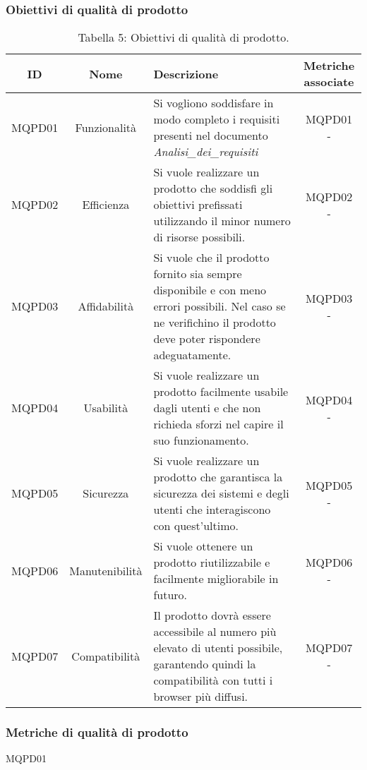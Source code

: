 \subsubsection{Obiettivi di qualità di prodotto}
\begin{table}[H]
	\centering
	\begin{tabularx}{\textwidth}{|c|c|X|c|}
		\hline
		\textbf{ID} & \textbf{Nome} & \textbf{Descrizione} & \textbf{Metriche associate}\\
		\hline
		MQPD01 & Funzionalità & Si vogliono soddisfare in modo completo i requisiti presenti nel documento \textit{Analisi\_dei\_requisiti} & MQPD01 - \\
		\hline
		MQPD02 & Efficienza & Si vuole realizzare un prodotto che soddisfi gli obiettivi prefissati utilizzando il minor numero di risorse possibili. & MQPD02 - \\
		\hline
		MQPD03 & Affidabilità & Si vuole che il prodotto fornito sia sempre disponibile e con meno errori possibili. Nel caso se ne verifichino il prodotto deve poter rispondere adeguatamente. & MQPD03 -\\
		\hline
		MQPD04 & Usabilità & Si vuole realizzare un prodotto facilmente usabile dagli utenti e che non richieda sforzi nel capire il suo funzionamento. & MQPD04 -\\
		\hline
		MQPD05 & Sicurezza & Si vuole realizzare un prodotto che garantisca la sicurezza dei sistemi e degli utenti che interagiscono con quest'ultimo. & MQPD05 -\\
		\hline
		MQPD06 & Manutenibilità & Si vuole ottenere un prodotto riutilizzabile e facilmente migliorabile in futuro. & MQPD06 -\\
		\hline
		MQPD07 & Compatibilità & Il prodotto dovrà essere accessibile al numero più elevato di utenti possibile, garantendo quindi la compatibilità con tutti i browser più diffusi. & MQPD07 -\\
		\hline
	\end{tabularx}
	\caption{Tabella 5: Obiettivi di qualità di prodotto.}
\end{table}
\subsubsection{Metriche di qualità di prodotto}
MQPD01